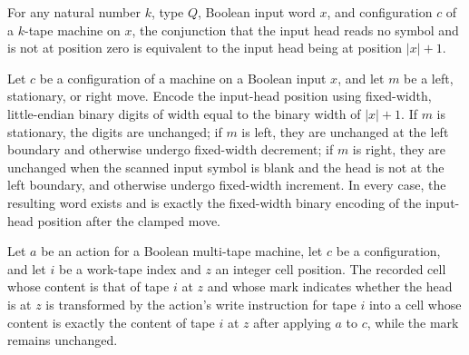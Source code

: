 \begin{theorem}
\label{Turing.recordStep_right_clamp}
\leanok
{}
For any natural number $k$, type $Q$, Boolean input word $x$, and configuration $c$ of a
$k$-tape machine on $x$, the conjunction that the input head reads no symbol and is not
at position zero is equivalent to the input head being at position $|x|+1$.
\end{theorem}

\begin{theorem}
\label{Turing.recordStep_position_digits}
\leanok
{}
Let $c$ be a configuration of a machine on a Boolean input $x$, and let $m$ be a left,
stationary, or right move. Encode the input-head position using fixed-width,
little-endian binary digits of width equal to the binary width of $|x|+1$. If $m$ is
stationary, the digits are unchanged; if $m$ is left, they are unchanged at the left
boundary and otherwise undergo fixed-width decrement; if $m$ is right, they are
unchanged when the scanned input symbol is blank and the head is not at the left
boundary, and otherwise undergo fixed-width increment. In every case, the resulting word
exists and is exactly the fixed-width binary encoding of the input-head position after
the clamped move.
\end{theorem}

\begin{theorem}
\label{Turing.recordStep_cell_write}
\leanok
{}
Let $a$ be an action for a Boolean multi-tape machine, let $c$ be a configuration, and
let $i$ be a work-tape index and $z$ an integer cell position. The recorded cell whose
content is that of tape $i$ at $z$ and whose mark indicates whether the head is at $z$
is transformed by the action's write instruction for tape $i$ into a cell whose content
is exactly the content of tape $i$ at $z$ after applying $a$ to $c$, while the mark
remains unchanged.
\end{theorem}

